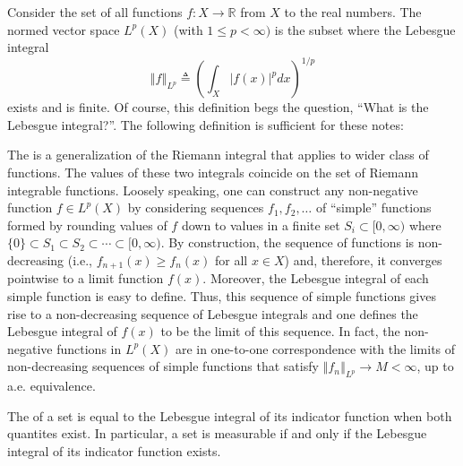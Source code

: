 \begin{example}
\begin{table}[p]
{\begin{minipage}[t]{\textwidth}
Consider the set of all functions $f\colon X\rightarrow\mathbb{R}$ from $X$ to the real numbers. The normed vector space $L^{p}(X)$ (with $1\leq p<\infty)$ is the subset where the Lebesgue integral
\[
\left\Vert f\right\Vert _{L^{p}}\triangleq\left(\int_{X}\left|f(x)\right|^{p}dx\right)^{1/p}
\]
exists and is finite. Of course, this definition begs the question, ``What is the Lebesgue integral?''. The following definition is sufficient for these notes:
\begin{definition}
The  is a generalization of the Riemann integral that applies to wider class of functions. The values of these two integrals coincide on the set of Riemann integrable functions.
Loosely speaking, one can construct any non-negative function $f\in L^{p}(X)$ by considering sequences $f_{1},f_{2},\ldots$ of ``simple'' functions formed by rounding values of $f$ down to values in a finite set $S_i \subset [0,\infty)$ where $\{0\} \subset S_1 \subset S_2 \subset \cdots \subset [0,\infty)$.
By construction, the sequence of functions is non-decreasing (i.e., $f_{n+1}(x)\geq f_{n}(x)$ for all $x\in X$) and, therefore, it converges pointwise to a limit function $f(x)$.
Moreover, the Lebesgue integral of each simple function is easy to define.
Thus, this sequence of simple functions gives rise to a non-decreasing sequence of Lebesgue integrals and one defines the Lebesgue integral of $f(x)$ to be the limit of this sequence.
In fact, the non-negative functions in $L^{p}(X)$ are in one-to-one correspondence with the limits of non-decreasing sequences of simple functions that satisfy $\left\Vert f_{n}\right\Vert _{L^{p}}\rightarrow M<\infty$, up to a.e. equivalence.
\end{definition}

\begin{definition}
The  of a set is equal to the Lebesgue integral of its indicator function when both quantites exist. In particular, a set is measurable if and only if the Lebesgue integral of its indicator function exists.
\end{definition}

\end{minipage}}

\end{table}


\end{example}
